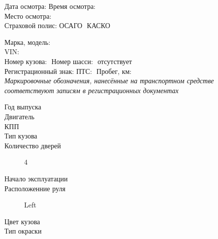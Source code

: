 \documentclass[a4paper,10pt]{report}
\begin{document}
\vspace{2mm}
\noindent Дата осмотра: \osm \hfill Время осмотра:\tm  \\
\noindent Место осмотра:\\
\noindent Страховой полис: ОСАГО {\large {}}\,\,КАСКО {\large {}}\,\,\, \polis\\
\vspace{-2mm}
\begin{tcolorbox}[title=\textsl{Сведения о транспортном средстве},leftrule=0pt,rightrule=0pt,toprule=0pt,titlerule=0pt,sharp corners,
	colback=white,colframe=white,coltitle=black,colbacktitle=YellowOrange]
\end{tcolorbox}
\vspace{-5mm}
\noindent Марка, модель:\,\, \\
\noindent VIN:\,\,\,\underline{{\large{\textbf{\vin}}}} \\  
\noindent Номер кузова:\,\,{\vin} \hfill Номер шасси:\,\, отсутствует\\  
Регистрационный знак:\,\,\grz \hfill ПТС:\,\,  \hfill Пробег, км:\,\,\\
\textsl{\color{blue}Маркировочные обозначения, нанесённые на транспортном средстве  соответствуют  записям в регистрационных документах}\\
\noindent\parbox[l][5mm]{70mm}
{\begin{description}
			\item[Год выпуска] \hfill {}
			\item[Двигатель] \hfill {}
			\item[КПП] \hfill {}
			\item[Тип кузова] \hfill  {}
			\item[Количество дверей] \hfill 4 
		\end{description}
	}   %
\hfill
\parbox[l][5mm]{70mm}{  
		\begin{description}
			\item[Начало эксплуатации] \hfill {}
			\item[Расположенние руля] \hfill Left
			\item[Цвет кузова] \hfill  {}
			\item[Тип окраски] \hfill {}
					\end{description}
}\\
\vspace{15mm}
\end{document}
